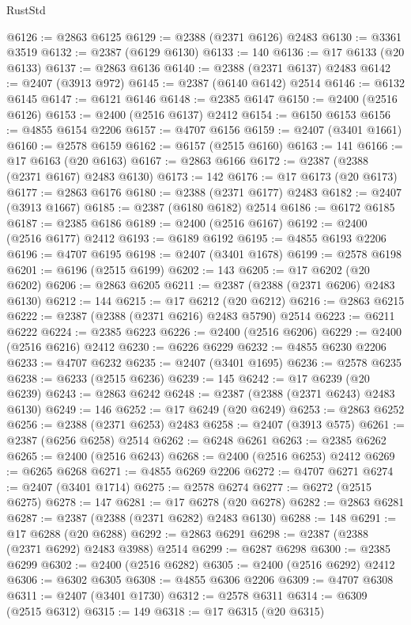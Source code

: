 \begin{lexlean}{RustStd}
\begin{coremodule}
{\begin{coremodule}
{{{{{{{{{{{{{{{{{{{{{{{{{{{{{{{{{{{{{{{{{{{{{{{{{{@6126 := @2863 @6125
@6129 := @2388 (@2371 @6126) @2483
@6130 := @3361 @3519
@6132 := @2387 (@6129 @6130)
@6133 := 140
@6136 := @17 @6133 (@20 @6133)
@6137 := @2863 @6136
@6140 := @2388 (@2371 @6137) @2483
@6142 := @2407 (@3913 @972)
@6145 := @2387 (@6140 @6142) @2514
@6146 := @6132 @6145
@6147 := @6121 @6146
@6148 := @2385 @6147
@6150 := @2400 (@2516 @6126)
@6153 := @2400 (@2516 @6137) @2412
@6154 := @6150 @6153
@6156 := @4855 @6154 @2206
@6157 := @4707 @6156
@6159 := @2407 (@3401 @1661)
@6160 := @2578 @6159
@6162 := @6157 (@2515 @6160)
@6163 := 141
@6166 := @17 @6163 (@20 @6163)
@6167 := @2863 @6166
@6172 := @2387 (@2388 (@2371 @6167) @2483 @6130)
@6173 := 142
@6176 := @17 @6173 (@20 @6173)
@6177 := @2863 @6176
@6180 := @2388 (@2371 @6177) @2483
@6182 := @2407 (@3913 @1667)
@6185 := @2387 (@6180 @6182) @2514
@6186 := @6172 @6185
@6187 := @2385 @6186
@6189 := @2400 (@2516 @6167)
@6192 := @2400 (@2516 @6177) @2412
@6193 := @6189 @6192
@6195 := @4855 @6193 @2206
@6196 := @4707 @6195
@6198 := @2407 (@3401 @1678)
@6199 := @2578 @6198
@6201 := @6196 (@2515 @6199)
@6202 := 143
@6205 := @17 @6202 (@20 @6202)
@6206 := @2863 @6205
@6211 := @2387 (@2388 (@2371 @6206) @2483 @6130)
@6212 := 144
@6215 := @17 @6212 (@20 @6212)
@6216 := @2863 @6215
@6222 := @2387 (@2388 (@2371 @6216) @2483 @5790) @2514
@6223 := @6211 @6222
@6224 := @2385 @6223
@6226 := @2400 (@2516 @6206)
@6229 := @2400 (@2516 @6216) @2412
@6230 := @6226 @6229
@6232 := @4855 @6230 @2206
@6233 := @4707 @6232
@6235 := @2407 (@3401 @1695)
@6236 := @2578 @6235
@6238 := @6233 (@2515 @6236)
@6239 := 145
@6242 := @17 @6239 (@20 @6239)
@6243 := @2863 @6242
@6248 := @2387 (@2388 (@2371 @6243) @2483 @6130)
@6249 := 146
@6252 := @17 @6249 (@20 @6249)
@6253 := @2863 @6252
@6256 := @2388 (@2371 @6253) @2483
@6258 := @2407 (@3913 @575)
@6261 := @2387 (@6256 @6258) @2514
@6262 := @6248 @6261
@6263 := @2385 @6262
@6265 := @2400 (@2516 @6243)
@6268 := @2400 (@2516 @6253) @2412
@6269 := @6265 @6268
@6271 := @4855 @6269 @2206
@6272 := @4707 @6271
@6274 := @2407 (@3401 @1714)
@6275 := @2578 @6274
@6277 := @6272 (@2515 @6275)
@6278 := 147
@6281 := @17 @6278 (@20 @6278)
@6282 := @2863 @6281
@6287 := @2387 (@2388 (@2371 @6282) @2483 @6130)
@6288 := 148
@6291 := @17 @6288 (@20 @6288)
@6292 := @2863 @6291
@6298 := @2387 (@2388 (@2371 @6292) @2483 @3988) @2514
@6299 := @6287 @6298
@6300 := @2385 @6299
@6302 := @2400 (@2516 @6282)
@6305 := @2400 (@2516 @6292) @2412
@6306 := @6302 @6305
@6308 := @4855 @6306 @2206
@6309 := @4707 @6308
@6311 := @2407 (@3401 @1730)
@6312 := @2578 @6311
@6314 := @6309 (@2515 @6312)
@6315 := 149
@6318 := @17 @6315 (@20 @6315)
}}}}}}}}}}}}}}}}}}}}}}}}}}}}}}}}}}}}}}}}}}}}}}}}}}
\end{coremodule}}
\end{coremodule}
\end{lexlean}
